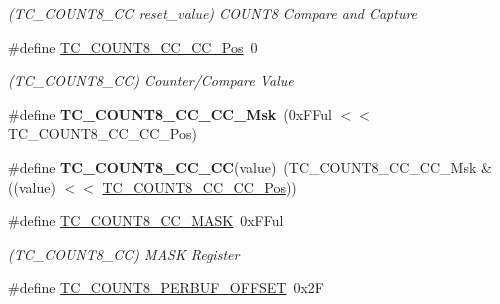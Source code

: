 \begin{DoxyCompactItemize}
\begin{DoxyCompactList}\small\item\em (T\+C\+\_\+\+C\+O\+U\+N\+T8\+\_\+\+C\+C reset\+\_\+value) C\+O\+U\+N\+T8 Compare and Capture \end{DoxyCompactList}\item 
\hypertarget{group___s_a_m_l21___t_c_gaa56699b5ea95a18388d72093d54317ed}{}\#define \hyperlink{group___s_a_m_l21___t_c_gaa56699b5ea95a18388d72093d54317ed}{T\+C\+\_\+\+C\+O\+U\+N\+T8\+\_\+\+C\+C\+\_\+\+C\+C\+\_\+\+Pos}~0\label{group___s_a_m_l21___t_c_gaa56699b5ea95a18388d72093d54317ed}

\begin{DoxyCompactList}\small\item\em (T\+C\+\_\+\+C\+O\+U\+N\+T8\+\_\+\+C\+C) Counter/\+Compare Value \end{DoxyCompactList}\item 
\hypertarget{group___s_a_m_l21___t_c_gaf4ebdc42a0fc6667831277419ccae9c6}{}\#define {\bfseries T\+C\+\_\+\+C\+O\+U\+N\+T8\+\_\+\+C\+C\+\_\+\+C\+C\+\_\+\+Msk}~(0x\+F\+Ful $<$$<$ T\+C\+\_\+\+C\+O\+U\+N\+T8\+\_\+\+C\+C\+\_\+\+C\+C\+\_\+\+Pos)\label{group___s_a_m_l21___t_c_gaf4ebdc42a0fc6667831277419ccae9c6}

\item 
\hypertarget{group___s_a_m_l21___t_c_ga9ef9ff57fccbdbe2e6b1b2a6bce4dc04}{}\#define {\bfseries T\+C\+\_\+\+C\+O\+U\+N\+T8\+\_\+\+C\+C\+\_\+\+C\+C}(value)~(T\+C\+\_\+\+C\+O\+U\+N\+T8\+\_\+\+C\+C\+\_\+\+C\+C\+\_\+\+Msk \& ((value) $<$$<$ \hyperlink{group___s_a_m_l21___t_c_gaa56699b5ea95a18388d72093d54317ed}{T\+C\+\_\+\+C\+O\+U\+N\+T8\+\_\+\+C\+C\+\_\+\+C\+C\+\_\+\+Pos}))\label{group___s_a_m_l21___t_c_ga9ef9ff57fccbdbe2e6b1b2a6bce4dc04}

\item 
\hypertarget{group___s_a_m_l21___t_c_gae12566d0ff39ddb141854bdfa4444497}{}\#define \hyperlink{group___s_a_m_l21___t_c_gae12566d0ff39ddb141854bdfa4444497}{T\+C\+\_\+\+C\+O\+U\+N\+T8\+\_\+\+C\+C\+\_\+\+M\+A\+S\+K}~0x\+F\+Ful\label{group___s_a_m_l21___t_c_gae12566d0ff39ddb141854bdfa4444497}

\begin{DoxyCompactList}\small\item\em (T\+C\+\_\+\+C\+O\+U\+N\+T8\+\_\+\+C\+C) M\+A\+S\+K Register \end{DoxyCompactList}\item 
\hypertarget{group___s_a_m_l21___t_c_gae7411817460eb18eaeb5bf04799e080f}{}\#define \hyperlink{group___s_a_m_l21___t_c_gae7411817460eb18eaeb5bf04799e080f}{T\+C\+\_\+\+C\+O\+U\+N\+T8\+\_\+\+P\+E\+R\+B\+U\+F\+\_\+\+O\+F\+F\+S\+E\+T}~0x2\+F\label{group___s_a_m_l21___t_c_gae7411817460eb18eaeb5bf04799e080f}


\end{DoxyCompactItemize}
